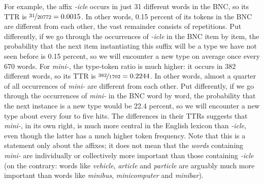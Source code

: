 For example, the affix  \textit{-icle} occurs in just 31 different words in the BNC,  so its TTR  is $\nicefrac{31}{20772} = 0.0015$. In other words, 0.15 percent of its tokens in the BNC are different from each other, the vast remainder consists of repetitions. Put differently, if we go through the occurrences of \textit{-icle} in the BNC  item by item, the probability  that the next item instantiating this suffix  will be a type  we have not seen before is 0.15 percent, so we will encounter a new type on average once every 670 words. For \textit{mini-}, the type\hyp{}token  ratio is much higher: it occurs in 382 different words, so its TTR is $\nicefrac{382}{1702} = 0.2244$. In other words, almost a quarter of all occurrences of \textit{mini-} are different from each other. Put differently, if we go through the occurrences of \textit{mini-} in the BNC  word by word, the probability  that the next instance is a new type would be 22.4 percent, so we will encounter a new type  about every four to five hits.  The differences in their TTRs  suggests that \textit{mini-}, in its own right, is much more central in the English lexicon  than \textit{-icle}, even though the latter has a much higher token frequency.  Note that this is a statement only about the affixes;  it does not mean that the \textit{words} containing \textit{mini-} are individually or collectively more important than those containing \textit{-icle} (on the contrary: words like \textit{vehicle}, \textit{article} and \textit{particle} are arguably much more important than words like \textit{minibus}, \textit{minicomputer} and \textit{minibar}).

